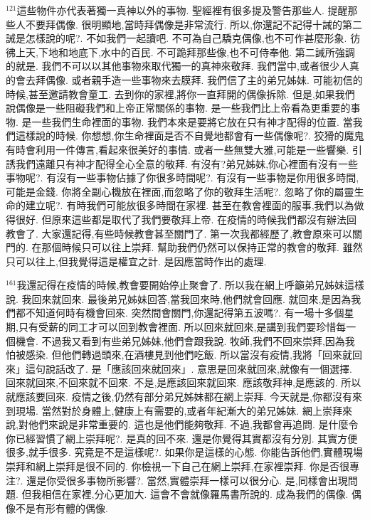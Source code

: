 \documentclass{book}
\begin{document}
$^{121}$這些物件亦代表著獨一真神以外的事物.
聖經裡有很多提及警告那些人.
提醒那些人不要拜偶像.
很明顯地,當時拜偶像是非常流行.
所以,你還記不記得十誡的第二誡是怎樣說的呢?.
不如我們一起讀吧.
不可為自己驕克偶像,也不可作甚麼形象.
彷彿上天,下地和地底下,水中的百民.
不可跪拜那些像,也不可侍奉他.
第二誡所強調的就是.
我們不可以以其他事物來取代獨一的真神來敬拜.
我們當中,或者很少人真的會去拜偶像.
或者親手造一些事物來去膜拜.
我們信了主的弟兄姊妹.
可能初信的時候,甚至邀請教會童工.
去到你的家裡,將你一直拜開的偶像拆除.
但是,如果我們說偶像是一些阻礙我們和上帝正常關係的事物.
是一些我們比上帝看為更重要的事物.
是一些我們生命裡面的事物.
我們本來是要將它放在只有神才配得的位置.
當我們這樣說的時候.
你想想,你生命裡面是否不自覺地都會有一些偶像呢?.
狡猾的魔鬼有時會利用一件傳言,看起來很美好的事情.
或者一些無雙大雅,可能是一些響樂.
引誘我們遠離只有神才配得全心全意的敬拜.
有沒有?弟兄姊妹,你心裡面有沒有一些事物呢?.
有沒有一些事物佔據了你很多時間呢?.
有沒有一些事物是你用很多時間,可能是金錢.
你將全副心機放在裡面,而忽略了你的敬拜生活呢?.
忽略了你的屬靈生命的建立呢?.
有時我們可能放很多時間在家裡.
甚至在教會裡面的服事,我們以為做得很好.
但原來這些都是取代了我們要敬拜上帝.
在疫情的時候我們都沒有辦法回教會了.
大家還記得,有些時候教會甚至關門了.
第一次我都經歷了,教會原來可以關門的.
在那個時候只可以往上崇拜.
幫助我們仍然可以保持正常的教會的敬拜.
雖然只可以往上,但我覺得這是權宜之計.
是因應當時作出的處理.

$^{161}$我還記得在疫情的時候,教會要開始停止聚會了.
所以我在網上呼籲弟兄姊妹這樣說.
我回來就回來.
最後弟兄姊妹回答,當我回來時,他們就會回應.
就回來,是因為我們都不知道何時有機會回來.
突然間會關門,你還記得第五波嗎?.
有一場十多個星期,只有受薪的同工才可以回到教會裡面.
所以回來就回來,是講到我們要珍惜每一個機會.
不過我又看到有些弟兄姊妹,他們會跟我說.
牧師,我們不回來崇拜,因為我怕被感染.
但他們轉過頭來,在酒樓見到他們吃飯.
所以當沒有疫情,我將「回來就回來」這句說話改了.
是「應該回來就回來」.
意思是回來就回來,就像有一個選擇.
回來就回來,不回來就不回來.
不是,是應該回來就回來.
應該敬拜神,是應該的.
所以就應該要回來.
疫情之後,仍然有部分弟兄姊妹都在網上崇拜.
今天就是,你都沒有來到現場.
當然對於身體上,健康上有需要的,或者年紀漸大的弟兄姊妹.
網上崇拜來說,對他們來說是非常重要的.
這也是他們能夠敬拜.
不過,我都會再追問.
是什麼令你已經習慣了網上崇拜呢?.
是真的回不來.
還是你覺得其實都沒有分別.
其實方便很多,就手很多.
究竟是不是這樣呢?.
如果你是這樣的心態.
你能告訴他們,實體現場崇拜和網上崇拜是很不同的.
你檢視一下自己在網上崇拜,在家裡崇拜.
你是否很專注?.
還是你受很多事物所影響?.
當然,實體崇拜一樣可以很分心.
是,同樣會出現問題.
但我相信在家裡,分心更加大.
這會不會就像羅馬書所說的.
成為我們的偶像.
偶像不是有形有體的偶像.
\end{document}
